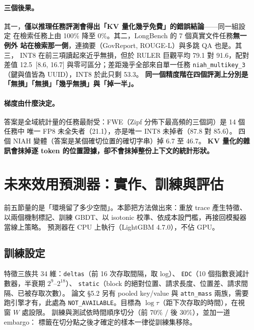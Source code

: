 \documentclass[11pt]{article}
\newcommand{\key}[1]{\textcolor{hlcol}{\textbf{#1}}}
\begin{document}
\paragraph{三個後果。}
其一，\key{僅以推理任務評測會得出「KV 量化幾乎免費」的錯誤結論}——同一組設定
在檢索任務上由 100\% 降至 0\%。其二，LongBench 的 7 個真實文件任務\textbf{無一例外
站在檢索那一側}，連摘要（GovReport, ROUGE-L）與多跳 QA 也是。其三，
INT8 在前三項讀起來近乎無損，但於 RULER 巨觀平均 79.1 對 91.6，配對差值
12.5 \,[8.6, 16.7] 與零可區分；差距幾乎全部來自單一任務 \texttt{niah\_multikey\_3}
（鍵與值皆為 UUID），INT8 於此只剩 53.3。
\key{同一個精度階在四個評測上分別是「無損」「無損」「幾乎無損」與「掉一半」。}

\paragraph{梯度由什麼決定。}
答案是全域統計量的任務最耐受：FWE（Zipf 分佈下最高頻的三個詞）是 14 個任務中
唯一 FP8 未全失者（21.1），亦是唯一 INT8 未掉者（87.8 對 85.6）。
四個 NIAH 變體（答案是某個確切位置的確切字串）掉 6.7 至 46.7。
\key{KV 量化的雜訊會抹掉逐 token 的位置證據，卻不會抹掉整份上下文的統計形狀。}

\section{未來效用預測器：實作、訓練與評估}

前五節量的是「環境留了多少空間」。本節把方法做出來：重放 trace 產生特徵、
以兩個機制標記、訓練 GBDT、以 isotonic 校準、依成本設門檻，再接回模擬器當線上策略。
預測器在 CPU 上執行（LightGBM 4.7.0），不佔 GPU。

\subsection{訓練設定}
特徵三族共 34 維：\texttt{deltas}（前 16 次存取間隔，取 log）、
\texttt{EDC}（10 個指數衰減計數器，半衰期 $2^{9}$–$2^{18}$）、
\texttt{static}（block 的絕對位置、請求長度、位置差、請求間隔、已被存取次數）。
論文 §5.2 另有 pooled key/value 與 \texttt{attn\_mass} 兩族，需要跑引擎才有，此處為
\texttt{NOT\_AVAILABLE}。目標為 $\log\tau$（距下次存取的時間），在視窗 $W$ 處設限。
訓練與測試依時間順序切分（前 70\% / 後 30\%），並加一道 embargo：
標籤在切分點之後才確定的樣本一律從訓練集移除。
\end{document}
